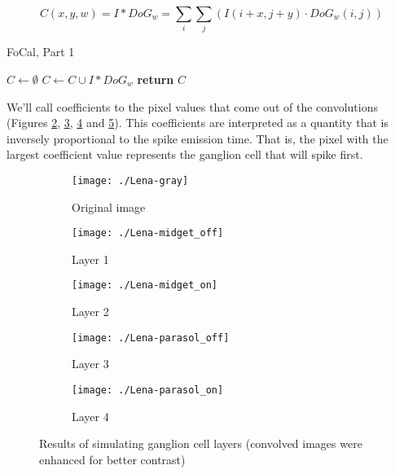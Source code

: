 \begin{equation}
\label{eq-convolution}
C(x,y,w) = I \ast DoG_w = \sum_i \sum_j \left( I(i+x, j+y) \cdot DoG_w(i,j)\right)
\end{equation}

\begin{algorithm}[h]
  \caption{FoCal, Part 1}
  \label{code-focal-conv}
  \begin{algorithmic}
    \State $C \leftarrow \emptyset$
    \State $C \leftarrow C \cup I \ast DoG_w$
    \EndFor
    \State \textbf{return} $C$
    \EndProcedure
  \end{algorithmic}
\end{algorithm}

We'll call coefficients to the pixel values that come out of the convolutions (Figures \ref{pic-lena-M-OFF}, \ref{pic-lena-M-ON}, \ref{pic-lena-P-OFF} and \ref{pic-lena-P-ON}). This coefficients are interpreted as a quantity that is inversely proportional to the spike emission time. That is, the pixel with the largest coefficient value represents the ganglion cell that will spike first.

\begin{figure}[hbt]
  \centering
  \begin{subfigure}[t]{0.32\textwidth}
    \centering
    \captionsetup{justification=centering,margin=0.1cm}
    \texttt{[image: ./Lena-gray]}
    \caption{Original image}
    \label{pic-lena}
  \end{subfigure}
  \begin{subfigure}[t]{0.32\textwidth}
    \centering
    \captionsetup{justification=centering,margin=0.1cm}
    \texttt{[image: ./Lena-midget\_off]}
    \caption{Layer 1}
    \label{pic-lena-M-OFF}
  \end{subfigure}
  \begin{subfigure}[t]{0.32\textwidth}
    \centering
    \captionsetup{justification=centering,margin=0.1cm}
    \texttt{[image: ./Lena-midget\_on]}
    \caption{Layer 2}
    \label{pic-lena-M-ON}
  \end{subfigure}
  \begin{subfigure}[t]{0.32\textwidth}
    \vspace*{0.8em}
    \centering
    \captionsetup{justification=centering,margin=0.1cm}
    \texttt{[image: ./Lena-parasol\_off]}
    \caption{Layer 3}
    \label{pic-lena-P-OFF}
  \end{subfigure}
  \begin{subfigure}[t]{0.32\textwidth}
    \vspace*{0.8em}
    \centering
    \captionsetup{justification=centering,margin=0.1cm}
    \texttt{[image: ./Lena-parasol\_on]}
    \caption{Layer 4}
    \label{pic-lena-P-ON}
  \end{subfigure}
  \caption{Results of simulating ganglion cell layers (convolved images were enhanced for better contrast)}
  \label{fig-convolution-results}
\end{figure}

